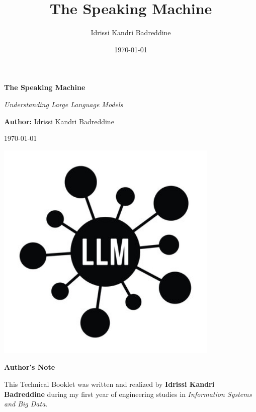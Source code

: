 \documentclass[12pt]{article}
\title{The Speaking Machine}
\author{Idrissi Kandri Badreddine}
\date{\today}
\begin{document}
\begin{titlepage}
  \centering
  \vspace*{1.5cm}
  
  {\Huge \bfseries The Speaking Machine \par}
  \vspace{1.5em}
  
  {\Large \textit{Understanding Large Language Models} \par}
  \vspace{3em}
  
  {\large \textbf{Author:} Idrissi Kandri Badreddine \par}
  \vspace{1em}
  
  {\large \today \par}
  \vspace{1em}
  
  \includegraphics[width=0.8\textwidth]{images/llm0.jpg}
  
  \vfill
\end{titlepage}


\newpage
\thispagestyle{empty}

\vspace*{4cm}

\begin{center}
    \Huge\textbf{Author's Note}
\end{center}

\vspace{1cm}

\noindent
This Technical Booklet was written and realized by \textbf{Idrissi Kandri Badreddine} during my first year of engineering studies in \textit{Information Systems and Big Data}.
\end{document}
